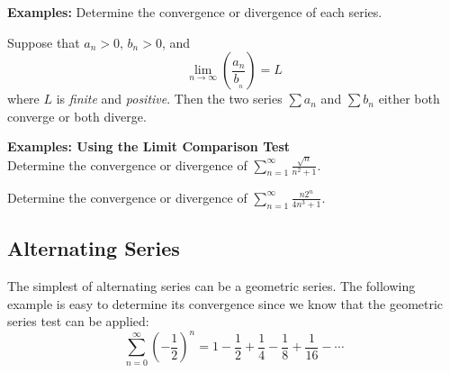 \documentclass[addpoints, 12pt]{exam}
\begin{document}
\noindent\textbf{Examples:} Determine the convergence or divergence of each series.

\newpage

\begin{tcolorbox}[title= THE LIMIT COMPARISON TEST,black,sharp corners,colback=white,colbacktitle=white,coltitle=black]

    Suppose that $a_n>0,\,b_n>0$, and
    \[\lim_{n\to\infty}\left(\frac{a_n}{b__n}\right)=L\]
    where $L$ is \textit{finite} and \textit{positive}. Then the two series $\displaystyle\sum a_n$ and $\displaystyle\sum b_n$ either both converge or both diverge.

\end{tcolorbox}
\vspace{.1in}
\noindent\textbf{Examples: Using the Limit Comparison Test}\\
Determine the convergence or divergence of $\displaystyle\sum_{n=1}^{\infty}\frac{\sqrt{n}}{n^2+1}$.


Determine the convergence or divergence of $\displaystyle\sum_{n=1}^\infty\frac{n2^n}{4n^3+1}$.




\newpage
{}
\subsection*{Alternating Series}
The simplest of alternating series can be a geometric series. The following example is easy to determine its convergence since we know that the geometric series test can be applied:
\[\sum_{n=0}^{\infty}\left(-\frac{1}{2}\right)^n=1-\frac{1}{2}+\frac{1}{4}-\frac{1}{8}+\frac{1}{16}-\cdots\]
\end{document}
